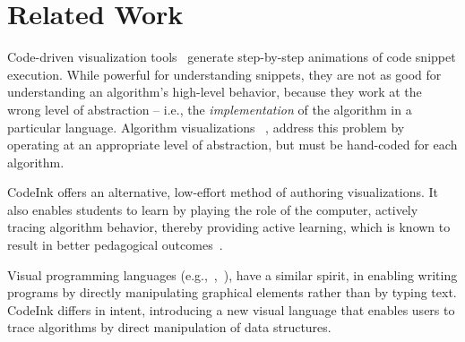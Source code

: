 \section{Related Work}

Code-driven visualization tools~\cite{Guo2013, Sorva2013} generate
step-by-step animations of code snippet execution. While powerful for
understanding snippets, they are not as good for understanding an
algorithm's high-level behavior, because they work at the wrong level
of abstraction -- i.e., the {\em implementation} of the algorithm in a
particular language. Algorithm visualizations ~\cite{AlgoViz}, address
this problem by operating at an appropriate level of
abstraction, but must be hand-coded for each algorithm.

CodeInk offers an alternative, low-effort method of authoring
visualizations. It also enables students to learn by playing the role of the computer, 
actively tracing algorithm behavior, thereby providing 
active learning, which is known 
to result in better pedagogical outcomes~\cite{Sorva2012Diss}.




Visual programming languages
(e.g.,~\cite{Alice2008},~\cite{Scratch2008}), have a similar spirit,
in enabling writing programs by directly manipulating graphical
elements rather than by typing text. CodeInk differs in intent,
introducing a new visual language that enables users to trace
algorithms by direct manipulation of data structures.

\begin{comment}
Direct manipulation (DM) user interfaces~\cite{Hutchins1985}, starting with
Shneiderman's initial definiton of the term~\cite{Shneiderman1982}, have long
been recognized to promote more satisfactory reactions among users than
command-line or WIMP interfaces. CodeInk's DM gesture set was designed with
these princples in mind: algorithm steps can be described using physical actions
(grabbing and dragging data structures), lowering the degree of indirection
between onscreen objects and the abstract data structures they represent. For
example, list elements can be rearranged by grabbing elements and moving them
into new positions, rather than by writing code or using menus.
\end{comment}

